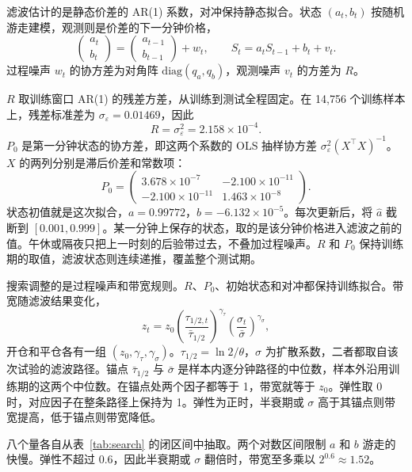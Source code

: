 \documentclass[11pt,fontset=none,scheme=plain]{ctexart}
\begin{document}
滤波估计的是静态价差的 AR(1) 系数，对冲保持静态拟合。状态 $(a_t, b_t)$ 按随机游走建模，观测则是价差的下一分钟价格，
\begin{equation}
\begin{pmatrix} a_t \\ b_t \end{pmatrix}
=
\begin{pmatrix} a_{t-1} \\ b_{t-1} \end{pmatrix}
+ w_t,
\qquad
S_t = a_t S_{t-1} + b_t + v_t.
\end{equation}
过程噪声 $w_t$ 的协方差为对角阵 $\mathrm{diag}(q_a, q_b)$，观测噪声 $v_t$ 的方差为 $R$。

$R$ 取训练窗口 AR(1) 的残差方差，从训练到测试全程固定。在 14{,}756 个训练样本上，残差标准差为 $\sigma_\varepsilon = 0.01469$，因此
\[
R = \sigma_\varepsilon^2 = 2.158\times 10^{-4}.
\]
$P_0$ 是第一分钟状态的协方差，即这两个系数的 OLS 抽样协方差 $\sigma_\varepsilon^2 (X^{\top} X)^{-1}$。$X$ 的两列分别是滞后价差和常数项：
\[
P_0 =
\begin{pmatrix}
3.678\times 10^{-7} & -2.100\times 10^{-11} \\
-2.100\times 10^{-11} & 1.463\times 10^{-8}
\end{pmatrix}.
\]
状态初值就是这次拟合，$a = 0.99772$，$b = -6.132\times 10^{-5}$。每次更新后，将 $\hat a$ 截断到 $[0.001, 0.999]$。某一分钟上保存的状态，取的是该分钟价格进入滤波之前的值。午休或隔夜只把上一时刻的后验带过去，不叠加过程噪声。$R$ 和 $P_0$ 保持训练期的取值，滤波状态则连续递推，覆盖整个测试期。

搜索调整的是过程噪声和带宽规则。$R$、$P_0$、初始状态和对冲都保持训练拟合。带宽随滤波结果变化，
\begin{equation}
z_t = z_0
\left(\frac{\tau_{1/2,t}}{\bar\tau_{1/2}}\right)^{\gamma_\tau}
\left(\frac{\sigma_t}{\bar\sigma}\right)^{\gamma_\sigma},
\end{equation}
开仓和平仓各有一组 $(z_0, \gamma_\tau, \gamma_\sigma)$。$\tau_{1/2} = \ln 2 / \theta$，$\sigma$ 为扩散系数，二者都取自该次试验的滤波路径。锚点 $\bar\tau_{1/2}$ 与 $\bar\sigma$ 是样本内逐分钟路径的中位数，样本外沿用训练期的这两个中位数。在锚点处两个因子都等于 1，带宽就等于 $z_0$。弹性取 0 时，对应因子在整条路径上保持为 1。弹性为正时，半衰期或 $\sigma$ 高于其锚点则带宽提高，低于锚点则带宽降低。

八个量各自从表~\ref{tab:search} 的闭区间中抽取。两个对数区间限制 $a$ 和 $b$ 游走的快慢。弹性不超过 0.6，因此半衰期或 $\sigma$ 翻倍时，带宽至多乘以 $2^{0.6} \approx 1.52$。
\end{document}
